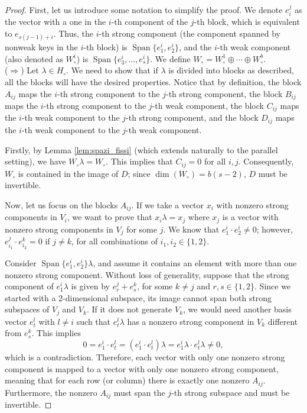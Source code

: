 \documentclass[10pt,a4paper]{amsart}
\DeclareMathOperator{\spn}{Span}
\newcommand{\ho}{H_\circ}
\newcommand{\wo}{W_\circ}
\begin{document}
\begin{proof}
First, let us introduce some notation to simplify the proof. We denote \( e_i^j \) as the vector with a one in the \( i \)-th component of the \( j \)-th block, which is equivalent to \( e_{s(j-1) + i} \). Thus, the \( i \)-th strong component (the component spanned by nonweak keys in the \( i \)-th block) is \( \spn\{ e^i_1, e^i_2 \} \), and the \( i \)-th weak component (also denoted as \( \wo^i \)) is \( \spn\{ e^i_3, \dots, e^i_s \} \). We define \( \wo = \wo^1 \oplus \cdots \oplus \wo^b \).\\

\noindent (\(\Rightarrow\)) Let \( \lambda \in \ho \). We need to show that if \( \lambda \) is divided into blocks as described, all the blocks will have the desired properties. Notice that by definition, the block \( A_{ij} \) maps the \( i \)-th strong component to the \( j \)-th strong component, the block \( B_{ij} \) maps the \( i \)-th strong component to the \( j \)-th weak component, the block \( C_{ij} \) maps the \( i \)-th weak component to the \( j \)-th strong component, and the block \( D_{ij} \) maps the \( i \)-th weak component to the \( j \)-th weak component.

Firstly, by Lemma \ref{lem:spazi_fissi} (which extends naturally to the parallel setting), we have \( \wo \lambda = \wo \). This implies that \( C_{ij} = 0 \) for all \( i, j \). Consequently, \( \wo \) is contained in the image of \( D \); since \( \dim(\wo) = b(s-2) \), \( D \) must be invertible.

Now, let us focus on the blocks \( A_{ij} \). If we take a vector \( x_i \) with nonzero strong components in \( V_i \), we want to prove that \( x_i \lambda = x_j \) where \( x_j \) is a vector with nonzero strong components in \( V_j \) for some \( j \). We know that \( e^i_1 \cdot e^i_2 \neq 0 \); however, \( e^j_{i_1} \cdot e^k_{i_2} = 0 \) if \( j \neq k \), for all combinations of \( i_1, i_2 \in \{1, 2\} \).

Consider \( \spn \{e^i_1, e^i_2 \} \lambda \), and assume it contains an element with more than one nonzero strong component. Without loss of generality, suppose that the strong component of \( e_1^i \lambda\) is given by \(e^j_{r} + e^k_s \),  for some $k\ne j$ and \(r,s\in\{1,2\}\). Since we started with a 2-dimensional subspace, its image cannot span both strong subspaces of \( V_j \) and \( V_k \). If it does not generate \( V_k \), we would need another basis vector \( e^l_t \) with \( l \neq i \) such that \( e^l_t \lambda \) has a nonzero strong component in \( V_k \) different from \(e^k_s \). This implies
\[
0 = e_1^i \cdot e^l_t = (e_1^i \cdot e^l_t) \lambda = e_1^i \lambda \cdot e^l_t \lambda \neq 0,
\]
which is a contradiction. Therefore, each vector with only one nonzero strong component is mapped to a vector with only one nonzero strong component, meaning that for each row (or column) there is exactly one nonzero \( A_{ij} \). Furthermore, the nonzero \( A_{ij} \) must span the \( j \)-th strong subspace and must be invertible.


\end{proof}
\end{document}

